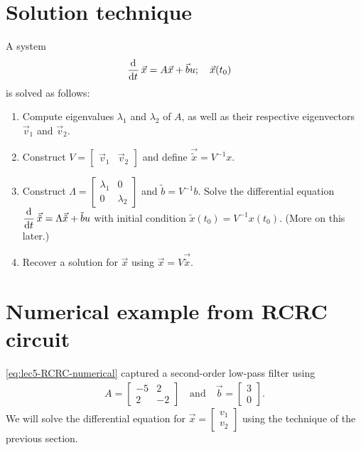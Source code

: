 \section{Solution technique}
A system
\begin{align}
  \dod{}{t} \vec x
  &= A \vec x + \vec b u; \quad \vec x (t_0)
\end{align}
is solved as follows:
\begin{enumerate}
  \item Compute eigenvalues \(\lambda_1\) and \(\lambda_2\) of \(A\), as well as their respective eigenvectors \(\vec v_1\) and \(\vec v_2\).
  \item Construct \(V = \begin{bmatrix}
            \vec v_1 & \vec v_2
        \end{bmatrix}\)
        and define
        \(\vec{\tilde x} = V^{-1} x\).
  \item
  Construct \(\Lambda = \begin{bmatrix}
    \lambda_1 & 0 \\
    0 & \lambda_2
  \end{bmatrix}\) and \(\tilde b = V^{-1} b\).
  Solve the differential equation
  \(\dod{}{t} \vec{\tilde x} = \Lambda \vec{\tilde x} + \tilde b u\)
  with initial condition \(\tilde x(t_0) = V^{-1} x(t_0)\). (More on this later.)
  \item Recover a solution for \(\vec x\) using \(\vec x = V \vec{\tilde x}\).
\end{enumerate}

\section{Numerical example from RCRC circuit}
\autoref{eq:lec5-RCRC-numerical} captured a second-order low-pass filter using
\begin{align}
  A = \begin{bmatrix}
    -5 & 2 \\ 2 & -2
\end{bmatrix} \quad \text{and} \quad
  \vec b = \begin{bmatrix}
    3 \\ 0
\end{bmatrix}.
\end{align}
We will solve the differential equation for \(\vec x = \begin{bmatrix}
  v_1 \\ v_2
\end{bmatrix}\) using the technique of the previous section.

